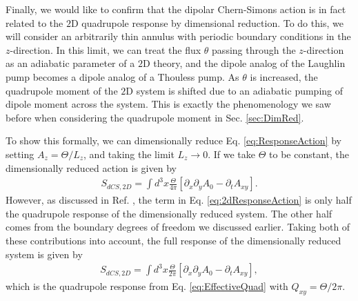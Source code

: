 \documentclass[prb,aps,twocolumn,groupaddress,floatfix]{revtex4-1}
\begin{document}
Finally, we would like to confirm that the dipolar Chern-Simons action is in fact related to the $2$D quadrupole response by dimensional reduction. To do this, we will consider an arbitrarily thin annulus with periodic boundary conditions in the $z$-direction. In this limit, we can treat the flux $\theta$ passing through the $z$-direction as an adiabatic parameter of a $2$D theory, and the dipole analog of the Laughlin pump becomes a dipole analog of a Thouless pump. As $\theta$ is increased, the quadrupole moment of the $2$D system is shifted due to an adiabatic pumping of dipole moment across the system. This is exactly the phenomenology we saw before when considering the quadrupole moment in Sec. \ref{sec:DimRed}. 

To show this formally, we can dimensionally reduce Eq. \ref{eq:ResponseAction} by setting $A_{z} = \Theta/L_z$, and taking the limit $L_z \rightarrow 0$. If we take $\Theta$ to be constant, the dimensionally reduced action is given by
\begin{equation}
\begin{split}
S_{dCS,2D} = \int d^3x \frac{\Theta}{4\pi} [ \partial_x \partial_y A_0- \partial_t A_{xy}].
\end{split}
\label{eq:2dResponseAction}\end{equation}
However, as discussed in Ref. , the term in Eq. \ref{eq:2dResponseAction} is only half the quadrupole response of the dimensionally reduced system. The other half comes from the boundary degrees of freedom we discussed earlier. Taking both of these contributions into account, the full response of the dimensionally reduced system is given by
\begin{equation}
\begin{split}
S_{dCS,2D} = \int d^3x \frac{\Theta}{2\pi} [ \partial_x \partial_y A_0- \partial_t A_{xy}],
\end{split}
\label{eq:2dResponseAction2}\end{equation}
which is the quadrupole response from Eq. \ref{eq:EffectiveQuad} with $Q_{xy} = \Theta /2\pi$.
\end{document}
